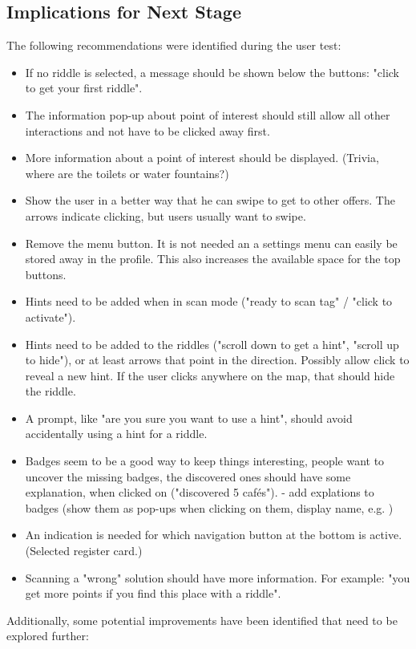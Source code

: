 \documentclass[10pt,twocolumn]{article} %
\begin{document}
\subsection*{Implications for Next Stage}
The following recommendations were identified during the user test:
\begin{itemize}[noitemsep]
  \item If no riddle is selected, a message should be shown below the buttons: "click to get your first riddle".
  \item The information pop-up about point of interest should still allow all other interactions and not have to be clicked away first.  
  \item More information about a point of interest should be displayed. (Trivia, where are the toilets or water fountains?)
  \item Show the user in a better way that he can swipe to get to other offers. The arrows indicate clicking, but users usually want to swipe. 
  \item Remove the menu button. It is not needed an a settings menu can easily be stored away in the profile. This also increases the available space for the top buttons.  
  \item Hints need to be added when in scan mode ("ready to scan tag" / "click to activate").
  \item Hints need to be added to the riddles ("scroll down to get a hint", "scroll up to hide"), or at least arrows that point in the direction. Possibly allow click to reveal a new hint. If the user clicks anywhere on the map, that should hide the riddle.
  \item A prompt, like "are you sure you want to use a hint", should avoid accidentally using a hint for a riddle.
  \item Badges seem to be a good way to keep things interesting, people want to uncover the missing badges, the discovered ones should have some explanation, when clicked on ("discovered 5 cafés").
- add explations to badges (show them as pop-ups when clicking on them, display name, e.g. )
  \item An indication is needed for which navigation button at the bottom is active.(Selected register card.)
  \item Scanning a "wrong" solution should have more information. For example: "you get more points if you find this place with a riddle".
\end{itemize}
Additionally, some potential improvements have been identified that need to be explored further:
\end{document}
